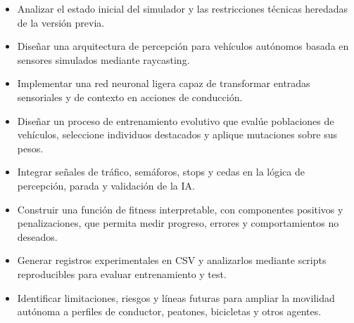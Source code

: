 \begin{itemize}[leftmargin=*]
  \item Analizar el estado inicial del simulador y las restricciones técnicas heredadas de la versión previa.
  \item Diseñar una arquitectura de percepción para vehículos autónomos basada en sensores simulados mediante raycasting.
  \item Implementar una red neuronal ligera capaz de transformar entradas sensoriales y de contexto en acciones de conducción.
  \item Diseñar un proceso de entrenamiento evolutivo que evalúe poblaciones de vehículos, seleccione individuos destacados y aplique mutaciones sobre sus pesos.
  \item Integrar señales de tráfico, semáforos, stops y cedas en la lógica de percepción, parada y validación de la IA\@.
  \item Construir una función de fitness interpretable, con componentes positivos y penalizaciones, que permita medir progreso, errores y comportamientos no deseados.
  \item Generar registros experimentales en CSV y analizarlos mediante scripts reproducibles para evaluar entrenamiento y test.
  \item Identificar limitaciones, riesgos y líneas futuras para ampliar la movilidad autónoma a perfiles de conductor, peatones, bicicletas y otros agentes.
\end{itemize}
